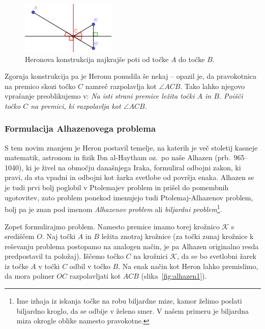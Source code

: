 \begin{figure}[h]
    \centering
    \includegraphics[width=0.4\textwidth]{images/alhazen/heron.png}
    \caption[Heronovo vprašanje]{Heronova konstrukcija najkrajše poti od točke $A$ do točke $B$.}
    \label{fig:heron}
\end{figure}

Zgornja konstrukcija pa je Heronu ponudila še nekaj -- opazil je, da pravokotnica na premico skozi točko $C$ namreč razpolavlja kot $\angle ACB$. Tako lahko njegovo vprašanje preoblikujemo v: \emph{Na isti strani premice ležita točki $A$ in $B$. Poišči točko $C$ na premici, ki razpolavlja kot $\angle ACB$.}


\subsubsection*{Formulacija Alhazenovega problema}

S tem novim znanjem je Heron postavil temelje, na katerih je več stoletij kasneje matematik, astronom in fizik Ibn al-Haytham oz.\ po naše Alhazen (prb.\ 965--1040), ki je živel na območju današnjega Iraka, formuliral odbojni zakon, ki pravi, da sta vpadni in odbojni kot žarka svetlobe od površja enaka. Alhazen se je tudi prvi bolj poglobil v Ptolemajev problem in prišel do pomembnih ugotovitev, zato problem ponekod imenujejo tudi Ptolemaj-Alhazenov problem, bolj pa je znan pod imenom \emph{Alhazenov problem} ali \emph{biljardni problem}\footnote{Ime izhaja iz iskanja točke na robu biljardne mize, kamor želimo poslati biljardno kroglo, da se odbije v želeno smer. V našem primeru je biljardna miza okrogle oblike namesto pravokotne.}. 

Zopet formulirajmo problem. Namesto premice imamo torej krožnico $\mathcal{K}$ s središčem $O$. Naj točki $A$ in $B$ ležita znotraj krožnice (za točki zunaj krožnice k reševanju problema postopamo na analogen način, je pa Alhazen originalno resda predpostavil ta položaj). Iščemo točko $C$ na krožnici $\mathcal{K}$, da se bo svetlobni žarek iz točke $A$ v točki $C$ odbil v točko $B$. Na enak način kot Heron lahko premislimo, da mora polmer $OC$ razpolavljati kot $ACB$ (slika~\ref{fig:alhazen1}).

